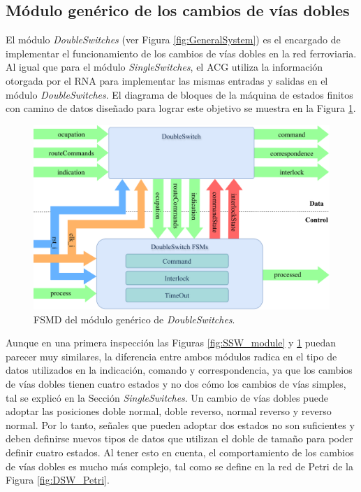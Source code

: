 \subsection{Módulo genérico de los cambios de vías dobles}
	\label{sec:ACG_dsw}
	
	El módulo \textit{DoubleSwitches} (ver Figura \ref{fig:GeneralSystem}) es el encargado de implementar el funcionamiento de los cambios de vías dobles en la red ferroviaria. Al igual que para el módulo \textit{SingleSwitches}, el ACG utiliza la información otorgada por el RNA para implementar las mismas entradas y salidas en el módulo \textit{DoubleSwitches}. El diagrama de bloques de la máquina de estados finitos con camino de datos diseñado para lograr este objetivo se muestra en la Figura \ref{fig:DSW_module}.
	
	\begin{figure}[H]
		\centering
		\includegraphics[width=1\textwidth]{Figuras/DSW_module}
		\centering\caption{FSMD del módulo genérico de \textit{DoubleSwitches}.}
		\label{fig:DSW_module}
	\end{figure}
	
	Aunque en una primera inspección las Figuras \ref{fig:SSW_module} y \ref{fig:DSW_module} puedan parecer muy similares, la diferencia entre ambos módulos radica en el tipo de datos utilizados en la indicación, comando y correspondencia, ya que los cambios de vías dobles tienen cuatro estados y no dos cómo los cambios de vías simples, tal se explicó en la Sección \textit{SingleSwitches}. Un cambio de vías dobles puede adoptar las posiciones doble normal, doble reverso, normal reverso y reverso normal. Por lo tanto, señales que pueden adoptar dos estados no son suficientes y deben definirse nuevos tipos de datos que utilizan el doble de tamaño para poder definir cuatro estados. Al tener esto en cuenta, el comportamiento de los cambios de vías dobles es mucho más complejo, tal como se define en la red de Petri de la Figura \ref{fig:DSW_Petri}.
	
